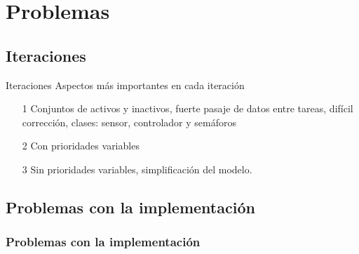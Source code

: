 \section{Problemas}

\subsection{Iteraciones}

\begin{frame}
	\begin{block}{Iteraciones}
		Aspectos más importantes en cada iteración
		\begin{itemize}
			\item[1] Conjuntos de activos y inactivos, fuerte pasaje de datos entre tareas,  difícil corrección, clases: sensor, controlador y semáforos
			\item[2] Con prioridades variables
			\item[3] Sin prioridades variables, simplificación del modelo.
		\end{itemize}
	\end{block}
\end{frame}

\subsection{Problemas con la implementación}

\begin{frame}
	\frametitle{Problemas con la implementación}
\end{frame}